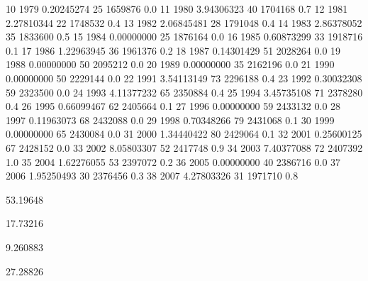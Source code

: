 \documentclass[a4paper]{article}                %
\begin{document}
\begin{Schunk}
\begin{Soutput}
10  1979         0.20245274     25 1659876                     0.0
11  1980         3.94306323     40 1704168                     0.7
12  1981         2.27810344     22 1748532                     0.4
13  1982         2.06845481     28 1791048                     0.4
14  1983         2.86378052     35 1833600                     0.5
15  1984         0.00000000     25 1876164                     0.0
16  1985         0.60873299     33 1918716                     0.1
17  1986         1.22963945     36 1961376                     0.2
18  1987         0.14301429     51 2028264                     0.0
19  1988         0.00000000     50 2095212                     0.0
20  1989         0.00000000     35 2162196                     0.0
21  1990         0.00000000     50 2229144                     0.0
22  1991         3.54113149     73 2296188                     0.4
23  1992         0.30032308     59 2323500                     0.0
24  1993         4.11377232     65 2350884                     0.4
25  1994         3.45735108     71 2378280                     0.4
26  1995         0.66099467     62 2405664                     0.1
27  1996         0.00000000     59 2433132                     0.0
28  1997         0.11963073     68 2432088                     0.0
29  1998         0.70348266     79 2431068                     0.1
30  1999         0.00000000     65 2430084                     0.0
31  2000         1.34440422     80 2429064                     0.1
32  2001         0.25600125     67 2428152                     0.0
33  2002         8.05803307     52 2417748                     0.9
34  2003         7.40377088     72 2407392                     1.0
35  2004         1.62276055     53 2397072                     0.2
36  2005         0.00000000     40 2386716                     0.0
37  2006         1.95250493     30 2376456                     0.3
38  2007         4.27803326     31 1971710                     0.8
\end{Soutput}
\begin{Soutput}
[1] 53.19648
\end{Soutput}
\begin{Soutput}
[1] 17.73216
\end{Soutput}
\begin{Soutput}
[1] 9.260883
\end{Soutput}
\begin{Soutput}
[1] 27.28826
\end{Soutput}
\end{Schunk}

\end{document}
